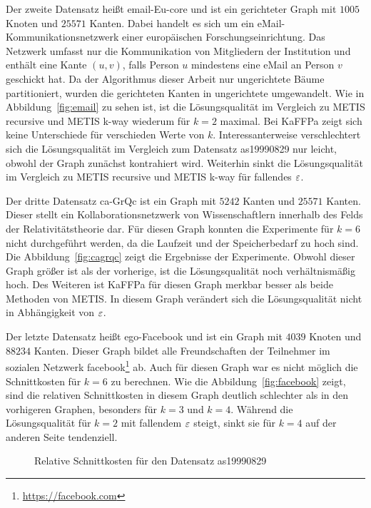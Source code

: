 Der zweite Datensatz heißt email-Eu-core und ist ein gerichteter Graph mit $1005$ Knoten und $25571$ Kanten.
Dabei handelt es sich um ein eMail\hyp Kommunikationsnetzwerk einer europäischen Forschungseinrichtung.
Das Netzwerk umfasst nur die Kommunikation von Mitgliedern der Institution und enthält eine Kante $(u, v)$, falls Person $u$ mindestens eine eMail an Person $v$ geschickt hat.
Da der Algorithmus dieser Arbeit nur ungerichtete Bäume partitioniert, wurden die gerichteten Kanten in ungerichtete umgewandelt.
Wie in Abbildung~\ref{fig:email} zu sehen ist, ist die Lösungsqualität im Vergleich zu METIS recursive und METIS k-way wiederum für $k=2$ maximal.
Bei KaFFPa zeigt sich keine Unterschiede für verschieden Werte von $k$.
Interessanterweise verschlechtert sich die Lösungsqualität im Vergleich zum Datensatz as19990829 nur leicht, obwohl der Graph zunächst kontrahiert wird.
Weiterhin sinkt die Lösungsqualität im Vergleich zu METIS recursive und METIS k-way für fallendes $\varepsilon$.

Der dritte Datensatz ca-GrQc ist ein Graph mit $5242$ Kanten und $25571$ Kanten.
Dieser stellt ein Kollaborationsnetzwerk von Wissenschaftlern innerhalb des Felds der Relativitätstheorie dar.
Für diesen Graph konnten die Experimente für $k=6$ nicht durchgeführt werden, da die Laufzeit und der Speicherbedarf zu hoch sind. 
Die Abbildung~\ref{fig:cagrqc} zeigt die Ergebnisse der Experimente.
Obwohl dieser Graph größer ist als der vorherige, ist die Lösungsqualität noch verhältnismäßig hoch.
Des Weiteren ist KaFFPa für diesen Graph merkbar besser als beide Methoden von METIS.
In diesem Graph verändert sich die Lösungsqualität nicht in Abhängigkeit von $\varepsilon$.

Der letzte Datensatz heißt ego-Facebook und ist ein Graph mit $4039$ Knoten und $88234$ Kanten.
Dieser Graph bildet alle Freundschaften der Teilnehmer im sozialen Netzwerk facebook\footnote{\url{https://facebook.com}} ab.
Auch für diesen Graph war es nicht möglich die Schnittkosten für $k=6$ zu berechnen.
Wie die Abbildung~\ref{fig:facebook} zeigt, sind die relativen Schnittkosten in diesem Graph deutlich schlechter als in den vorhigeren Graphen, besonders für $k=3$ und $k=4$.
Während die Lösungsqualität für $k=2$ mit fallendem $\varepsilon$ steigt, sinkt sie für $k=4$ auf der anderen Seite tendenziell.

\begin{figure}[t]
    \centering
    
    \caption{Relative Schnittkosten für den Datensatz as19990829\label{fig:as}}
\end{figure}


